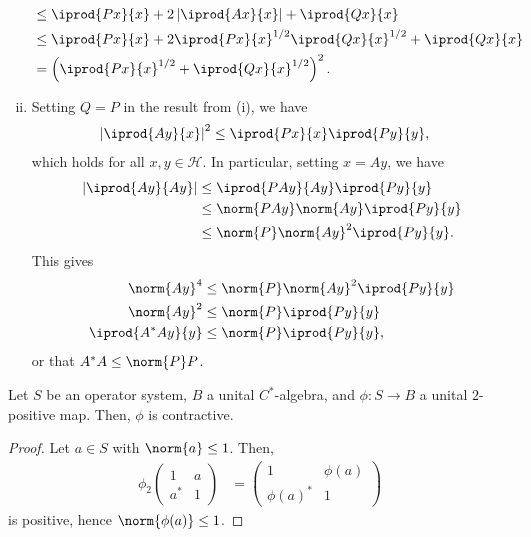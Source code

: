 \documentclass[10pt]{mypackage}
\begin{document}
\begin{solution}
\begin{enumerate}[(i)]
\begin{align*}
                               &\leq \iprod{Px}{x} + 2 \left\vert \iprod{Ax}{x} \right\vert + \iprod{Qx}{x}\\
                               &\leq \iprod{Px}{x} + 2 \iprod{Px}{x}^{1/2} \iprod{Qx}{x}^{1/2} + \iprod{Qx}{x}\\
                               &= \left( \iprod{Px}{x}^{1/2} + \iprod{Qx}{x}^{1/2} \right)^2.
    \end{align*}
  \item Setting $Q = P$ in the result from (i), we have
    \begin{align*}
      \left\vert \iprod{Ay}{x} \right\vert^2 &\leq \iprod{Px}{x} \iprod{Py}{y},
    \end{align*}
    which holds for all $x,y\in \mathcal{H}$. In particular, setting $x = Ay$, we have
    \begin{align*}
      \left\vert \iprod{Ay}{Ay} \right\vert &\leq \iprod{PAy}{Ay} \iprod{Py}{y}\\
                                            &\leq \norm{PAy}\norm{Ay} \iprod{Py}{y}\\
                                            &\leq \norm{P} \norm{Ay}^2 \iprod{Py}{y}.
    \end{align*}
    This gives
    \begin{align*}
      \norm{Ay}^4 &\leq \norm{P}\norm{Ay}^2 \iprod{Py}{y}\\
      \norm{Ay}^2 &\leq \norm{P} \iprod{Py}{y}\\
      \iprod{A^{\ast}Ay}{y} &\leq \norm{P} \iprod{Py}{y},
    \end{align*}
    or that $A^{\ast}A \leq \norm{P}P$.
  \end{enumerate}
\end{solution}
\begin{proposition}
  Let $S$ be an operator system, $B$ a unital $C^{\ast}$-algebra, and $\phi\colon S\rightarrow B$ a unital $2$-positive map. Then, $\phi$ is contractive.
\end{proposition}
\begin{proof}
  Let $a\in S$ with $\norm{a}\leq 1$. Then,
  \begin{align*}
    \phi_2 \begin{pmatrix}1 & a \\ a^{\ast} & 1\end{pmatrix} &= \begin{pmatrix}1 & \phi(a) \\ \phi(a)^{\ast} & 1\end{pmatrix}
  \end{align*}
  is positive, hence $\norm{\phi(a)}\leq 1$.
\end{proof}
\end{document}

